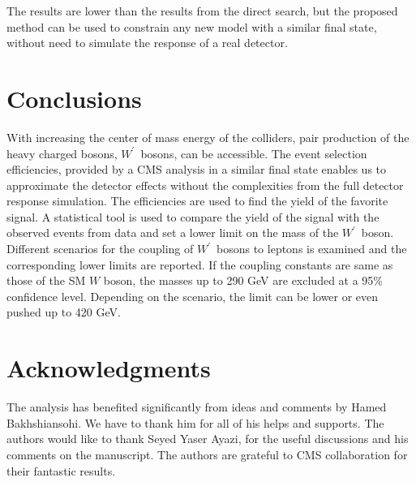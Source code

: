 \documentclass[preprint,showpacs,preprintnumbers]{revtex4}
\newcommand{\wprime}{\ensuremath{W^\prime}~}
\begin{document}
The results are lower than the results from the direct search, but the proposed method can be used to constrain any new model with a similar final state, without need to simulate the response of a real detector.

\section{Conclusions}\label{sec:conclusion} 
With increasing the center of mass energy of the colliders, pair production of the heavy charged bosons, \wprime bosons, can be accessible. The event selection efficiencies, provided by a CMS analysis in a similar final state enables us to approximate the detector effects without the complexities from the full detector response simulation. The efficiencies are used to find the yield of the favorite signal. A statistical tool is used to compare the yield of the signal with the observed events from data and set a lower limit on the mass of the \wprime boson. Different 
scenarios for the coupling of \wprime bosons to leptons is examined and the corresponding lower limits are reported. If the coupling constants are same as those of the SM $W$ boson, the masses up to 290 GeV are excluded at a 95\% confidence level. Depending on the scenario, the limit can be lower or even pushed up to 420 GeV.


\section{Acknowledgments}
The analysis has benefited significantly from ideas and comments by Hamed Bakhshiansohi. We have to thank him for all of his helps and supports. 
The authors would like to thank Seyed Yaser Ayazi, for the useful discussions and 
his comments on the manuscript. The authors are grateful to CMS collaboration for their fantastic results. 
\end{document}

